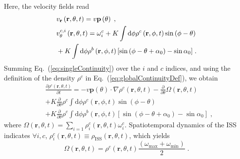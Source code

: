 \documentclass{article}
\begin{document}
Here, the velocity fields read
\begin{subequations}
    \begin{align}
        &v_{\mathbf{r}}\left( \mathbf{r},\theta ,t \right) =v\mathbf{p}\left( \theta \right) \;,\\
        &v_{\theta}^{c,i}\left( \mathbf{r},\theta ,t \right) =\omega _{i}^{c}+K\int{\text{d}\phi \rho^{c}\left( \mathbf{r},\phi ,t \right) \sin \left( \phi -\theta \right)}\notag\\
        &+K\int{\text{d}\phi \rho ^{b}\left( \mathbf{r},\phi ,t \right) \left[ \sin \left( \phi -\theta +\alpha _0 \right) -\sin \alpha _0 \right]}\;.
    \end{align}
\end{subequations}
Summing Eq.~(\ref{eq:singleContinuity}) over the $i$ and $c$ indices, and using the definition of the density $\rho ^c$ in Eq.~(\ref{eq:globalContinuityDef}), we obtain  
\begin{equation}
    \label{eq:globalContinuity}
    \begin{aligned}
        &\frac{\partial \rho ^c\left( \mathbf{r},\theta ,t \right)}{\partial t}=-v\mathbf{p}\left( \theta \right) \cdot \nabla \rho ^c\left( \mathbf{r},\theta ,t \right) -\frac{\partial}{\partial \theta}\Omega \left( \mathbf{r},\theta ,t \right)\\
        &+K\frac{\partial}{\partial \theta}\rho ^c\int{\text{d}\phi \rho ^c\left( \mathbf{r},\phi ,t \right) \sin \left( \phi -\theta \right)}\\
        &+K\frac{\partial}{\partial \theta}\rho ^c\int{\text{d}\phi \rho ^b\left( \mathbf{r},\phi ,t \right) \left[ \sin \left( \phi -\theta +\alpha _0 \right) -\sin \alpha _0 \right]}\;,
    \end{aligned}
\end{equation}
where $\Omega \left( \mathbf{r},\theta ,t \right) =\sum_{i=1}{\rho _{i}^{c}\left( \mathbf{r},\theta ,t \right) \omega _{i}^{c}}$.
Spatiotemporal dynamics of the ISS indicates $\forall i,c$, $\rho _{i}^{c}\left( \mathbf{r},\theta ,t \right) \equiv \rho _{\text{ISS}}\left( \mathbf{r},\theta ,t \right)$, which yields
\begin{equation}
    \Omega \left( \mathbf{r},\theta ,t \right) =\rho ^c\left( \mathbf{r},\theta ,t \right) \frac{\left( \omega _{\max}+\omega _{\min} \right)}{2}\;.
\end{equation} 
\end{document}
